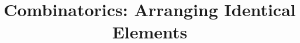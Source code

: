 \documentclass[a4paper,12pt]{article}
\begin{document}
\title{Combinatorics: Arranging Identical Elements}
\newcommand\event{S.3,4 Elite Mathematics Training}
\newcommand\learningobjective{
\item Understand the concepts of combinatorics and permutations
\item Find the number of ways to arrange identical elements
\item Learn the extension of arranging identical elements
}

\myfrontpage







\begin{question}[]{4}
    
    
    
    
    
    
    
    
\end{question}
\end{document}
